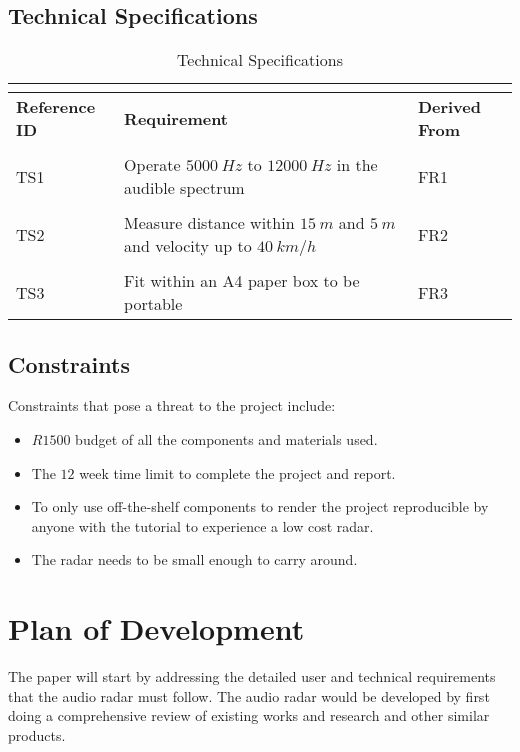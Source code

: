 \subsection{Technical Specifications}
\begin{table}[h!]
    \begin{tabular}{ p{3cm}p{8.75cm}p{3cm} }
         \multicolumn{3}{c}{} \\
         \hline
        \textbf{Reference ID} & \textbf{Requirement} & \textbf{Derived From} \\
         \hline
         \\ TS1 & Operate $5000\ Hz$ to $12000\ Hz$ in the audible spectrum & FR1\\
         \\ TS2 & Measure distance within $15\ m$ and $5\ m$ and velocity up to $40\ km/h$ & FR2\\
         \\ TS3 & Fit within an A4 paper box to be portable & FR3\\
         \hline
    \end{tabular}
    \caption{Technical Specifications}
    \label{table:TechSpecs}
\end{table}

\subsection{Constraints}
Constraints that pose a threat to the project include:
\begin{itemize}
\item $R1500$ budget of all the components and materials used.
\item The $12$ week time limit to complete the project and report.
\item To only use off-the-shelf components to render the project reproducible by anyone with the tutorial to experience a low cost radar.
\item The radar needs to be small enough to carry around.
\end{itemize}

\section{Plan of Development}
The paper will start by addressing the detailed user and technical requirements that the audio radar must follow. The audio radar would be developed by first doing a comprehensive review of existing works and research and other similar products. 

